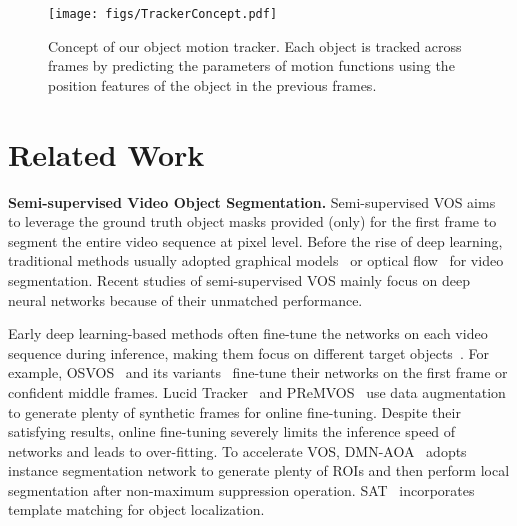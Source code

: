 \documentclass[journal]{IEEEtran}
\begin{document}
\begin{figure}[t]
\centering
\texttt{[image: figs/TrackerConcept.pdf]}
\caption{Concept of our object motion tracker. Each object is tracked across frames by predicting the parameters of motion functions using the position features of the object in the previous frames.}
\label{fig:tracker}
\end{figure}



\section{Related Work}\label{related work}
\textbf{Semi-supervised Video Object Segmentation.} Semi-supervised VOS aims to leverage the ground truth object masks provided (only) for the first frame to segment the entire video sequence at pixel level. Before the rise of deep learning, traditional methods usually adopted graphical models~\cite{TraditionalGraphVOS} or optical flow~\cite{TraditionalFlowVOS} for video segmentation. Recent studies of semi-supervised VOS mainly focus on deep neural networks because of their unmatched performance.

Early deep learning-based methods often fine-tune the networks on each video sequence during inference, making them focus on different target objects~\cite{MaskTrack,MoNet,MHPVOS,TAN_DTTM,FRTM}. For example, OSVOS~\cite{OSVOS} and its variants~\cite{OnAVOS,OSVOS_S,E_OSVOS} fine-tune their networks on the first frame or confident middle frames. Lucid Tracker~\cite{Lucid} and PReMVOS~\cite{PReMVOS} use data augmentation to generate plenty of synthetic frames for online fine-tuning. Despite their satisfying results, online fine-tuning severely limits the inference speed of networks and leads to over-fitting. To accelerate VOS, DMN-AOA~\cite{DMN-AOA} adopts instance segmentation network to generate plenty of ROIs and then perform local segmentation after non-maximum suppression operation. SAT~\cite{SAT} incorporates template matching for object localization.
\end{document}
